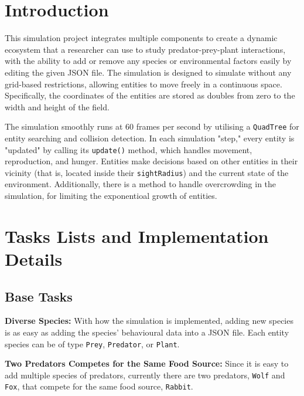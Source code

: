 \documentclass[12pt, a4paper]{scrartcl}
\begin{document}
\begin{multicols}{2}


\section{Introduction}

\noindent This simulation project integrates multiple components to create a dynamic ecosystem that a researcher can use to
study predator-prey-plant interactions, with the ability to add or remove any species or environmental factors easily
by editing the given JSON file.
The simulation is designed to simulate without any grid-based restrictions, allowing entities to move freely in a
continuous space. Specifically, the coordinates of the entities are stored as doubles from zero to the width and height
of the field.

\noindent The simulation smoothly runs at 60 frames per second by utilising a \verb|QuadTree| for entity searching and
collision detection. In each simulation "step," every entity is "updated" by calling its \verb|update()| method, which
handles movement, reproduction, and hunger. Entities make decisions based on other entities in their vicinity
(that is, located inside their \verb|sightRadius|) and the current state of the environment. Additionally, there is a
method to handle overcrowding in the simulation, for limiting the exponentioal growth of entities.

\section{Tasks Lists and Implementation Details}

\subsection{Base Tasks}

  \noindent \textbf{Diverse Species:} With how the simulation is implemented, adding new species is as easy as adding 
  the species' behavioural data into a JSON file. Each entity species can be of type \verb|Prey|, \verb|Predator|,
  or \verb|Plant|.
  
  \noindent \textbf{Two Predators Competes for the Same Food Source:}
  Since it is easy to add multiple species of predators, currently there are two predators, \verb|Wolf| and \verb|Fox|,
  that compete for the same food source, \verb|Rabbit|.
  

\end{multicols}
\end{document}
